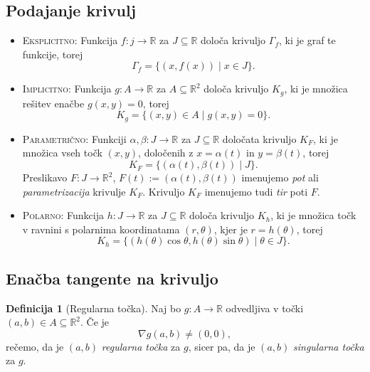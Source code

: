 \documentclass[11pt]{article}
\theoremstyle{definition}
\newtheorem{definicija}{Definicija}[section]
\theoremstyle{definition}
\theoremstyle{definition}
\theoremstyle{theorem}
\begin{document}

\subsection{Podajanje krivulj}
\vspace{0.5cm}

\begin{itemize}
	\item \textsc{Eksplicitno:} Funkcija $f: j \rightarrow \mathbb{R}$ za $J \subseteq \mathbb{R}$ določa krivuljo $\Gamma_f$, ki je graf te funkcije, torej
	$$\Gamma_f = \{(x, f(x)) \mid x \in J\}.$$
	\item \textsc{Implicitno:} Funkcija $g: A \rightarrow \mathbb{R}$ za $A \subseteq \mathbb{R}^2$ določa krivuljo $K_g$, ki je množica rešitev enačbe $g(x, y) = 0$, torej
	$$K_g = \{(x, y) \in A \mid g(x, y) = 0\}.$$
	\item \textsc{Parametrično:} Funkciji $\alpha, \beta: J \rightarrow \mathbb{R}$ za $J \subseteq \mathbb{R}$ določata krivuljo $K_F$, ki je množica vseh točk $(x, y)$, določenih z $x = \alpha(t)$ in $y = \beta(t)$, torej
	$$K_F = \{(\alpha(t), \beta(t)) \mid J\}.$$
	Preslikavo $F: J \rightarrow \mathbb{R}^2$, $F(t) := (\alpha(t), \beta(t))$ imenujemo \textit{pot} ali \textit{parametrizacija} krivulje $K_F$. Krivuljo $K_F$ imenujemo tudi \textit{tir} poti $F$.
	\item \textsc{Polarno:} Funkcija $h: J \rightarrow \mathbb{R}$ za $J \subseteq \mathbb{R}$ določa krivuljo $K_h$, ki je množica točk v ravnini s polarnima koordinatama $(r, \theta)$, kjer je $r = h(\theta)$, torej
	$$K_h = \{(h(\theta)\cos{\theta}, h(\theta)\sin{\theta}) \mid \theta \in J\}.$$
\end{itemize}
\vspace{0.5cm}


\subsection{Enačba tangente na krivuljo}
\vspace{0.5cm}

\begin{definicija}[Regularna točka]

Naj bo $g: A \rightarrow \mathbb{R}$ odvedljiva v točki $(a, b) \in A \subseteq \mathbb{R}^2$. Če je 
$$\nabla g(a, b) \neq (0, 0),$$
rečemo, da je $(a, b)$ \textit{regularna točka} za $g$, sicer pa, da je $(a, b)$ \textit{singularna točka} za $g$. 

\end{definicija}
\vspace{0.5cm}
\end{document}
